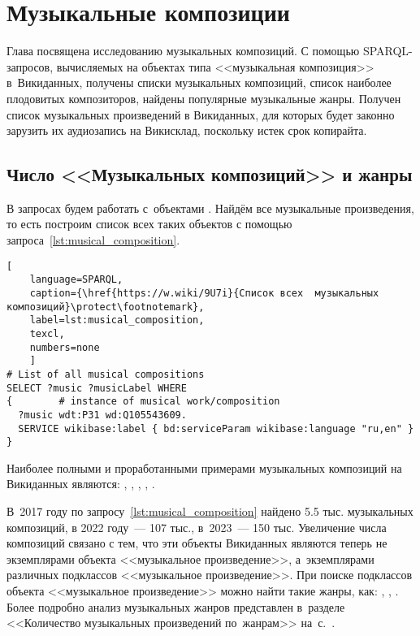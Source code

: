 \chapter{Музыкальные композиции}
\label{ch:musical-composition}
Глава посвящена исследованию музыкальных композиций. 
С помощью SPARQL-запросов, вычисляемых на объектах типа <<музыкальная композиция>> в~Викиданных, 
получены списки музыкальных композиций, список наиболее плодовитых композиторов, 
найдены популярные музыкальные жанры. 
Получен список музыкальных произведений в Викиданных, 
для которых будет законно зарузить их аудиозапись на Викисклад, поскольку истек срок копирайта.

\section{Число <<Музыкальных композиций>> и жанры}

В запросах будем работать с~объектами . 
Найдём все музыкальные произведения, то есть 
построим список всех таких объектов с помощью запроса~\ref{lst:musical_composition}.

\begin{lstlisting}[ 
    language=SPARQL,
    caption={\href{https://w.wiki/9U7i}{Список всех  музыкальных композиций}\protect\footnotemark},
    label=lst:musical_composition,
    texcl,
    numbers=none
    ]
# List of all musical compositions
SELECT ?music ?musicLabel WHERE
{        # instance of musical work/composition
  ?music wdt:P31 wd:Q105543609. 
  SERVICE wikibase:label { bd:serviceParam wikibase:language "ru,en" }
}
\end{lstlisting}%

Наиболее полными и проработанными примерами музыкальных композиций на Викиданных являются: 
, 
, 
, 
, 
.

В~2017 году по запросу~\ref{lst:musical_composition} найдено \num{5,5} тыс. музыкальных композиций, 
в 2022 году~--- 107 тыс., в~2023~--- 150 тыс. 
Увеличение числа композиций связано с тем, 
что эти объекты Викиданных являются теперь не экземплярами объекта <<музыкальное произведение>>, 
а~экземплярами различных подклассов <<музыкальное произведение>>. 
При поиске подклассов объекта <<музыкальное произведение>> можно найти такие жанры, как: 
, 
, 
. 
Более подробно анализ музыкальных жанров представлен в~разделе 
<<Количество музыкальных произведений по~жанрам>> на~с.~\pageref{chapter:Number-of-musical-works-by-genre}.


